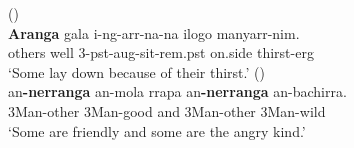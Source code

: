 \documentclass{article}
\begin{document}
\begin{exe}
 (\citealt[268]{bowern12})\\
\gll \textbf{Aranga} gala i-ng-arr-na-na ilogo manyarr-nim.\\
others well 3-{\sc pst-aug}-sit-{\sc rem.pst} on.side thirst-{\sc erg}\\
\glt `Some lay down because of their thirst.'
 (\citealt[84]{green87})\\
\gll an\textbf{-nerranga}    an-mola    rrapa    an\textbf{-nerranga}    an-bachirra.\\
    3Man-other    3Man-good    and    3Man-other    3Man-wild\\
\glt `Some are friendly and some are the angry kind.'


\end{exe}

\end{document}
